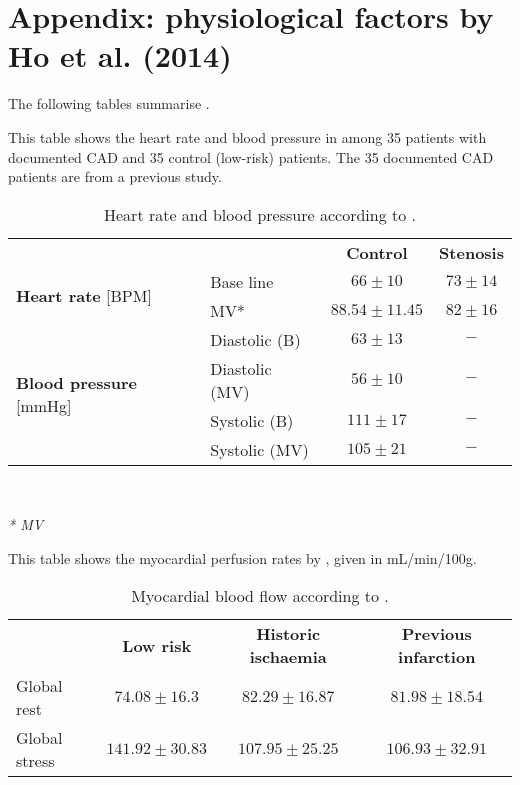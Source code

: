 \chapter{Appendix: physiological factors by Ho et al. (2014)}\label{app:physoverview_ho}
The following tables summarise \cite{ho2014dynamic}.
\begin{table}[h!]
\caption{Heart rate and blood pressure according to \cite{ho2014dynamic}.}
This table shows the heart rate and blood pressure in \citep{ho2014dynamic} among 35 patients with documented \ac{CAD} and 35 control (low-risk) patients. The 35 documented CAD patients are from a previous study.
\begin{tabular}{l|l|cc|}
          \multicolumn{1}{c}{ } & \multicolumn{1}{c}{ } &  \multicolumn{1}{c}{\textbf{Control}} & \multicolumn{1}{c}{\textbf{Stenosis}} \\
          \cline{2-4}
\multirow{2}{*}{\textbf{Heart rate} [BPM]} &  Base line &  $66\pm 10$ &  $73\pm 14$  \\
& MV* &  $88.54\pm 11.45$ & $82\pm 16$   \\
\cline{2-4}
\multirow{4}{*}{\textbf{Blood pressure} [mmHg]} & Diastolic (B) & $63\pm 13$ & $-$ \\
& Diastolic (MV)& $56 \pm 10$ & $-$ \\
& Systolic (B) 	& $111\pm 17$ & $-$ \\
& Systolic (MV) & $105\pm 21$ & $-$ \\
\cline{2-4}
\end{tabular} \\
\raggedright
\textit{* \acf{MV}}
\label{tab:ho_physfact}
\end{table}

\begin{table}[h!]
\caption{Myocardial blood flow according to \cite{ho2014dynamic}.}
This table shows the myocardial perfusion rates by \cite{ho2014dynamic}, given in mL/min/100g.\\
\begin{tabular}{l|ccc|}
			\multicolumn{1}{c}{ } & \multicolumn{1}{c}{\textbf{Low risk}} & \multicolumn{1}{c}{\textbf{Historic ischaemia}} & \multicolumn{1}{c}{\textbf{Previous infarction}} \\
          \cline{2-4}
Global rest 	& $74.08\pm 16.3$ & $82.29\pm 16.87$ & $81.98\pm 18.54$\\
Global stress   & $141.92\pm 30.83$ & $107.95\pm 25.25$ & $106.93\pm 32.91$\\
\cline{2-4}
\end{tabular} \\
\label{tab:hoFlows}
\end{table}